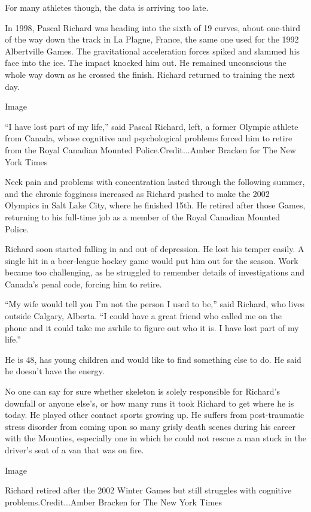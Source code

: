 For many athletes though, the data is arriving too late.

In 1998, Pascal Richard was heading into the sixth of 19 curves, about
one-third of the way down the track in La Plagne, France, the same one
used for the 1992 Albertville Games. The gravitational acceleration
forces spiked and slammed his face into the ice. The impact knocked him
out. He remained unconscious the whole way down as he crossed the
finish. Richard returned to training the next day.

Image

``I have lost part of my life,'' said Pascal Richard, left, a former
Olympic athlete from Canada, whose cognitive and psychological problems
forced him to retire from the Royal Canadian Mounted
Police.Credit...Amber Bracken for The New York Times

Neck pain and problems with concentration lasted through the following
summer, and the chronic fogginess increased as Richard pushed to make
the 2002 Olympics in Salt Lake City, where he finished 15th. He retired
after those Games, returning to his full-time job as a member of the
Royal Canadian Mounted Police.

Richard soon started falling in and out of depression. He lost his
temper easily. A single hit in a beer-league hockey game would put him
out for the season. Work became too challenging, as he struggled to
remember details of investigations and Canada's penal code, forcing him
to retire.

``My wife would tell you I'm not the person I used to be,'' said
Richard, who lives outside Calgary, Alberta. ``I could have a great
friend who called me on the phone and it could take me awhile to figure
out who it is. I have lost part of my life.''

He is 48, has young children and would like to find something else to
do. He said he doesn't have the energy.

No one can say for sure whether skeleton is solely responsible for
Richard's downfall or anyone else's, or how many runs it took Richard to
get where he is today. He played other contact sports growing up. He
suffers from post-traumatic stress disorder from coming upon so many
grisly death scenes during his career with the Mounties, especially one
in which he could not rescue a man stuck in the driver's seat of a van
that was on fire.

Image

Richard retired after the 2002 Winter Games but still struggles with
cognitive problems.Credit...Amber Bracken for The New York Times

